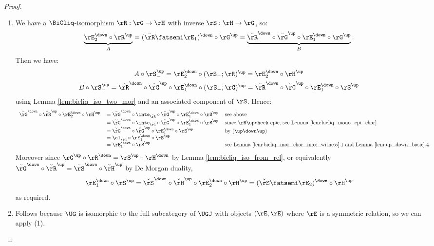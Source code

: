 \documentclass{article}
\begin{document}
\begin{proof}
\begin{enumerate}
\item
We have a $\BiCliq$-isomorphism $\rR : \rG \to \rH$ with inverse $\rS : \rH \to \rG$, so:
\[
\underbrace{\rE_2^\down \circ \rR^\up}_A
= (\breve{\rR} \fatsemi \rE_1)^\down \circ \rG^\up
= \underbrace{\breve{\rR}^\down \circ \breve{\rG}^\up \circ \rE_1^\down \circ \rG^\up}_B.
\]
Then we have:
\[
\begin{tabular}{c}
$A \circ \rS_-^\up
= \rE_2^\down \circ (\rS_- ; \rR)^\up
= \rE_2^\down \circ \rH^\up$
\\[1ex]
$B \circ \rS_-^\up
= \breve{\rR}^\down \circ \breve{\rG}^\up \circ \rE_1^\down \circ (\rS_-;\rG)^\up
= \breve{\rR}^\down \circ \breve{\rG}^\up \circ \rE_1^\down \circ \rS^\up$
\end{tabular}
\]
using Lemma \ref{lem:bicliq_iso_two_mor} and an associated component of $\rS$. Hence:
\[
\begin{tabular}{lll}
$\breve{\rG}^\down \circ \breve{\rR}^\up \circ \rE_2^\down \circ \rH^\up$
&
$= \breve{\rG}^\down \circ \inte_{\breve{\rR}} \circ \breve{\rG}^\up \circ \rE_1^\down \circ \rS^\up$
& see above
\\&
$= \breve{\rG}^\down \circ \inte_{\breve{\rG}} \circ \breve{\rG}^\up \circ \rE_1^\down \circ \rS^\up$
& since $\rR\spcheck$ epic, see Lemma \ref{lem:bicliq_mono_epi_char}
\\&
$= \breve{\rG}^\down \circ \breve{\rG}^\up \circ \rE_1^\down \circ \rS^\up$
& by $(\up\down\up)$
\\&
$= \cl_{\breve{\rG}} \circ \rE_1^\down \circ \rS^\up$
\\&
$= \rE_1^\down \circ \rS^\up$
& see Lemma \ref{lem:bicliq_mor_char_max_witness}.1 and Lemma \ref{lem:up_down_basic}.4.
\end{tabular}
\]
Moreover since $\rG^\up \circ \rR^\down = \rS^\up \circ \rH^\down$ by Lemma \ref{lem:bicliq_iso_from_rel}, or equivalently $\breve{\rG}^\down \circ \breve{\rR}^\up =  \breve{\rS}^\down \circ \breve{\rH}^\up$ by De Morgan duality,
\[
\rE_1^\down \circ \rS^\up
= \breve{\rS}^\down \circ \breve{\rH}^\up \circ \rE_2^\down \circ \rH^\up
= (\breve{\rS} \fatsemi \rE_2)^\down \circ \rH^\up
\]
as required.

\item
Follows because $\UG$ is isomorphic to the full subcategory of $\UGJ$ with objects $(\rE,\rE)$ where $\rE$ is a symmetric relation, so we can apply (1).

\end{enumerate}
\end{proof}
\end{document}
